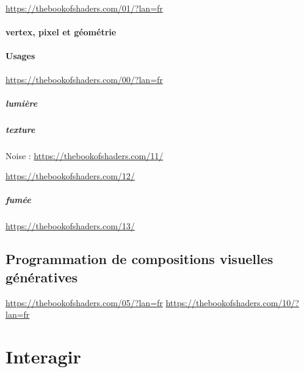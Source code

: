 \documentclass[
  french,
]{book}
\begin{document}
\url{https://thebookofshaders.com/01/?lan=fr}

\hypertarget{vertex-pixel-et-guxe9omuxe9trie}{%
\subsubsection{vertex, pixel et géométrie}\label{vertex-pixel-et-guxe9omuxe9trie}}

\hypertarget{usages-2}{%
\subsubsection{Usages}\label{usages-2}}

\url{https://thebookofshaders.com/00/?lan=fr}

\hypertarget{lumiuxe8re}{%
\paragraph{lumière}\label{lumiuxe8re}}

\hypertarget{texture-1}{%
\paragraph{texture}\label{texture-1}}

Noise : \url{https://thebookofshaders.com/11/}

\url{https://thebookofshaders.com/12/}

\hypertarget{fumuxe9e}{%
\paragraph{fumée}\label{fumuxe9e}}

\url{https://thebookofshaders.com/13/}

\hypertarget{programmation-de-compositions-visuelles-guxe9nuxe9ratives}{%
\section{Programmation de compositions visuelles génératives}\label{programmation-de-compositions-visuelles-guxe9nuxe9ratives}}

\url{https://thebookofshaders.com/05/?lan=fr}
\url{https://thebookofshaders.com/10/?lan=fr}

\hypertarget{interagir}{%
\chapter{Interagir}\label{interagir}}
\end{document}

